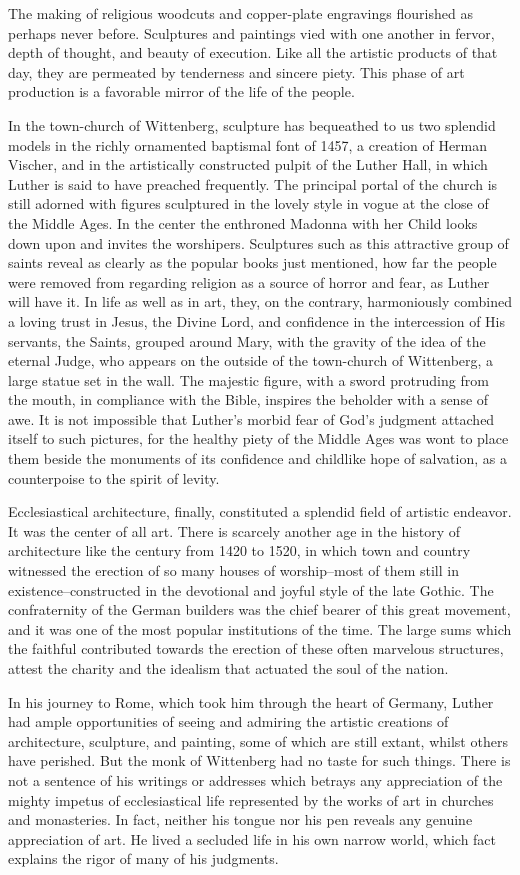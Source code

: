 The making of religious woodcuts and copper-plate engravings
flourished as perhaps never before. Sculptures and paintings vied with
one another in fervor, depth of thought, and beauty of execution.
Like all the artistic products of that day, they are permeated by
tenderness and sincere piety. This phase of art production is a favorable
mirror of the life of the people.

In the town-church of Wittenberg, sculpture has bequeathed to
us two splendid models in the richly ornamented baptismal font
of 1457, a creation of Herman Vischer, and in the artistically constructed
pulpit of the Luther Hall, in which Luther is said to have
preached frequently. The principal portal of the church is still
adorned with figures sculptured in the lovely style in vogue at the
close of the Middle Ages. In the center the enthroned Madonna with
her Child looks down upon and invites the worshipers. Sculptures
such as this attractive group of saints reveal as clearly as the popular
books just mentioned, how far the people were removed from regarding religion
as a source of horror and fear, as Luther will have
it. In life as well as in art, they, on the contrary, harmoniously
combined a loving trust in Jesus, the Divine Lord, and confidence
in the intercession of His servants, the Saints, grouped around Mary,
with the gravity of the idea of the eternal Judge, who appears
on the outside of the town-church of Wittenberg, a large statue set
in the wall. The majestic figure, with a sword protruding from the
mouth, in compliance with the Bible, inspires the beholder with a
sense of awe. It is not impossible that Luther’s morbid fear of God’s
judgment attached itself to such pictures, for the healthy piety of
the Middle Ages was wont to place them beside the monuments of
its confidence and childlike hope of salvation, as a counterpoise to
the spirit of levity.

Ecclesiastical architecture, finally, constituted a splendid field of
artistic endeavor. It was the center of all art. There is scarcely another
age in the history of architecture like the century from 1420
to 1520, in which town and country witnessed the erection of so
many houses of worship--most of them still in existence--constructed in
the devotional and joyful style of the late Gothic. The
confraternity of the German builders was the chief bearer of this
great movement, and it was one of the most popular institutions
of the time. The large sums which the faithful contributed towards
the erection of these often marvelous structures, attest the charity
and the idealism that actuated the soul of the nation.

In his journey to Rome, which took him through the heart of
Germany, Luther had ample opportunities of seeing and admiring
the artistic creations of architecture, sculpture, and painting, some
of which are still extant, whilst others have perished. But the monk
of Wittenberg had no taste for such things. There is not a sentence
of his writings or addresses which betrays any appreciation of the
mighty impetus of ecclesiastical life represented by the works of art
in churches and monasteries. In fact, neither his tongue nor his pen
reveals any genuine appreciation of art. He lived a secluded life in
his own narrow world, which fact explains the rigor of many of
his judgments.
